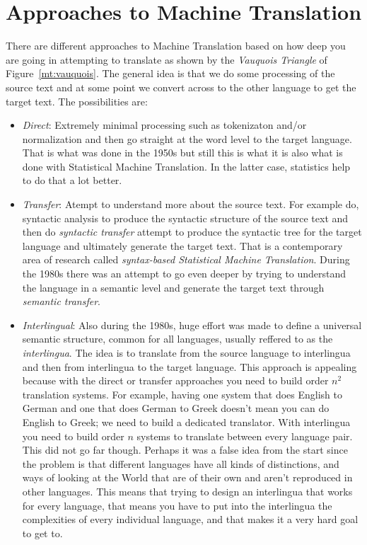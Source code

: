 \documentclass[a4paper,10pt]{report}
\begin{document}
\section*{Approaches to Machine Translation}
There are different approaches to Machine Translation based on how deep you are going in attempting to translate as shown by the \emph{Vauquois Triangle} of Figure~\ref{mt:vauquois}. The general idea is that we do some processing of the source text and at some point we convert across to the other language to get the target text. The possibilities are:
\begin{itemize}
 \item \emph{Direct}: Extremely minimal processing such as tokenizaton and/or normalization and then go straight at the word level to the target language. That is what was done in the 1950s but still this is what it is also what is done with Statistical Machine Translation. In the latter case, statistics help to do that a lot better.
 \item \emph{Transfer}: Atempt to understand more about the source text. For example do, syntactic analysis to produce the syntactic structure of the source text and then do \emph{syntactic transfer} attempt to produce the syntactic tree for the target language and ultimately generate the target text. That is a contemporary area of research called \emph{syntax-based Statistical Machine Translation}. During the 1980s there was an attempt to go even deeper by trying to understand the language in a semantic level and generate the target text through \emph{semantic transfer}.
 \item \emph{Interlingual}: Also during the 1980s, huge effort was made to define a universal semantic structure, common for all languages, usually reffered to as the \emph{interlingua}. The idea is to translate from the source language to interlingua and then from interlingua to the target language. This approach is appealing because with the direct or transfer approaches you need to build order $n^2$ translation systems. For example, having one system that does English to German and one that does German to Greek doesn't mean you can do English to Greek; we need to build a dedicated translator. With interlingua you need to build order $n$ systems to translate between every language pair. This did not go far though. Perhaps it was a false idea from the start since the problem is that different languages have all kinds of distinctions, and ways of looking at the World that are of their own and aren’t reproduced in other languages. This means that trying to design an interlingua that works for every language, that means you have to put into the interlingua the complexities of every individual language, and that makes it a very hard goal to get to. 
\end{itemize}
\end{document}
